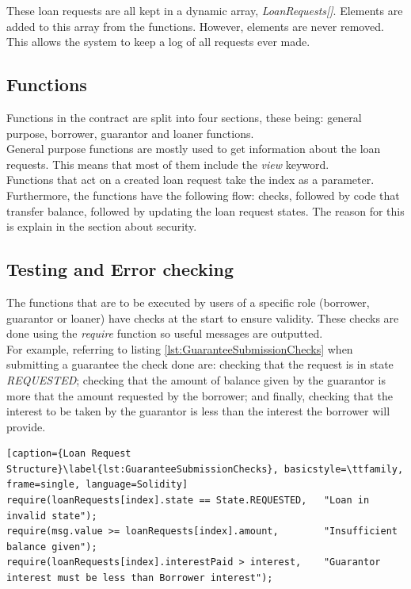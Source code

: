 \documentclass[a4paper, 12pt]{article}
\begin{document}
These loan requests are all kept in a dynamic array, \textit{LoanRequests[]}. Elements are added to this array from the functions. However, elements are never removed. This allows the system to keep a log of all requests ever made.

\subsection{Functions}

Functions in the contract are split into four sections, these being: general purpose, borrower, guarantor and loaner functions.
\\
General purpose functions are mostly used to get information about the loan requests. This means that most of them include the \textit{view} keyword.
\\
Functions that act on a created loan request take the index as a parameter. Furthermore, the functions have the following flow: checks, followed by code that transfer balance, followed by updating the loan request states. The reason for this is explain in the section about security. 

\subsection{Testing and Error checking}
The functions that are to be executed by users of a specific role (borrower, guarantor or loaner) have checks at the start to ensure validity. These checks are done using the \textit{require} function so useful messages are outputted. 
\\
For example, referring to listing \ref{lst:GuaranteeSubmissionChecks} when submitting a guarantee the check done are: checking that the request is in state \textit{REQUESTED}; checking that the amount of balance given by the guarantor is more that the amount requested by the borrower; and finally, checking that the interest to be taken by the guarantor is less than the interest the borrower will provide.

\begin{lstlisting}[caption={Loan Request Structure}\label{lst:GuaranteeSubmissionChecks}, basicstyle=\ttfamily, frame=single, language=Solidity]
require(loanRequests[index].state == State.REQUESTED,   "Loan in invalid state");   
require(msg.value >= loanRequests[index].amount,        "Insufficient balance given");
require(loanRequests[index].interestPaid > interest,    "Guarantor interest must be less than Borrower interest");
\end{lstlisting}
\end{document}
